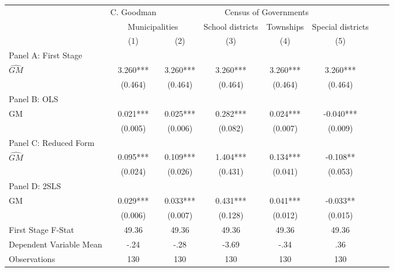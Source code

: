    \begin{tabular}{l*{7}{c}} \toprule
&\multicolumn{1}{c}{C. Goodman}&\multicolumn{4}{c}{Census of Governments}\\\cmidrule(lr){2-2}\cmidrule(lr){3-6}
&\multicolumn{2}{c}{Municipalities}&\multicolumn{1}{c}{School districts}&\multicolumn{1}{c}{Townships}&\multicolumn{1}{c}{Special districts}\\\cmidrule(lr){2-3}\cmidrule(lr){4-6}
&\multicolumn{1}{c}{(1)}&\multicolumn{1}{c}{(2)}&\multicolumn{1}{c}{(3)}&\multicolumn{1}{c}{(4)}&\multicolumn{1}{c}{(5)}\\
\cmidrule(lr){1-6}
\multicolumn{5}{l}{Panel A: First Stage}\\
\cmidrule(lr){1-6}
$\widehat{GM}$  &    3.260***&    3.260***&    3.260***&    3.260***&    3.260***\\
                &  (0.464)   &  (0.464)   &  (0.464)   &  (0.464)   &  (0.464)   \\
\cmidrule(lr){1-6}
\multicolumn{5}{l}{Panel B: OLS}\\
\cmidrule(lr){1-6}
GM              &    0.021***&    0.025***&    0.282***&    0.024***&   -0.040***\\
                &  (0.005)   &  (0.006)   &  (0.082)   &  (0.007)   &  (0.009)   \\
\cmidrule(lr){1-6}
\multicolumn{5}{l}{Panel C: Reduced Form}\\
\cmidrule(lr){1-6}
$\widehat{GM}$  &    0.095***&    0.109***&    1.404***&    0.134***&   -0.108** \\
                &  (0.024)   &  (0.026)   &  (0.431)   &  (0.041)   &  (0.053)   \\
\cmidrule(lr){1-6}
\multicolumn{5}{l}{Panel D: 2SLS}\\
\cmidrule(lr){1-6}
GM              &    0.029***&    0.033***&    0.431***&    0.041***&   -0.033** \\
                &  (0.006)   &  (0.007)   &  (0.128)   &  (0.012)   &  (0.015)   \\
\midrule
First Stage F-Stat&    49.36   &    49.36   &    49.36   &    49.36   &    49.36   \\
Dependent Variable Mean&     -.24   &     -.28   &    -3.69   &     -.34   &      .36   \\
Observations    &      130   &      130   &      130   &      130   &      130   \\
       \bottomrule \end{tabular}
